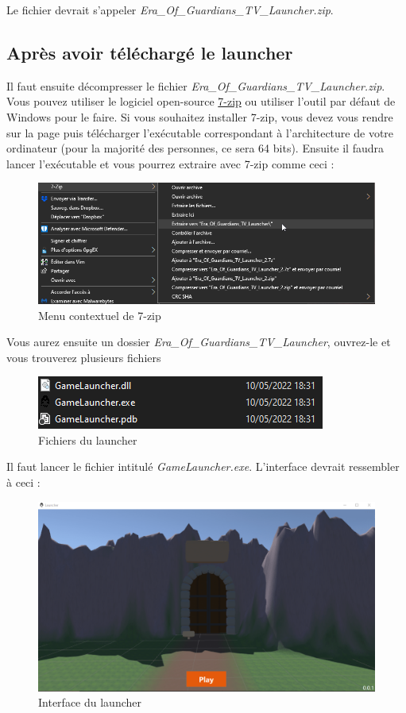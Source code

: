 \documentclass[a4paper, 12pt]{article}
\begin{document}
	Le fichier devrait s'appeler \textit{Era\_Of\_Guardians\_TV\_Launcher.zip}.
	
	\subsection{Après avoir téléchargé le launcher}
	Il faut ensuite décompresser le fichier \textit{Era\_Of\_Guardians\_TV\_Launcher.zip}. Vous pouvez utiliser le logiciel open-source \href{https://www.7-zip.fr/}{7-zip} ou utiliser l'outil par défaut de Windows pour le faire. Si vous souhaitez installer 7-zip, vous devez vous rendre sur la page puis télécharger l'exécutable correspondant à l'architecture de votre ordinateur (pour la majorité des personnes, ce sera 64 bits). Ensuite il faudra lancer l'exécutable et vous pourrez extraire avec 7-zip comme ceci :
	
	\begin{figure}[ht]
		\centering
		\includegraphics[scale=0.6]{images/7zip_menu.png}
		\caption{Menu contextuel de 7-zip}
	\end{figure}
	
	Vous aurez ensuite un dossier \textit{Era\_Of\_Guardians\_TV\_Launcher}, ouvrez-le et vous trouverez plusieurs 
	fichiers
	
	\begin{figure}[ht]
		\centering
		\includegraphics[scale=0.8]{images/fichiers.png}
		\caption{Fichiers du launcher}
	\end{figure}

	Il faut lancer le fichier intitulé \textit{GameLauncher.exe}. L'interface devrait ressembler à ceci :
	\clearpage
	\begin{figure}[ht]
		\centering
		\includegraphics[scale=0.4]{images/launcher.png}
		\caption{Interface du launcher}
	\end{figure}
\end{document}
